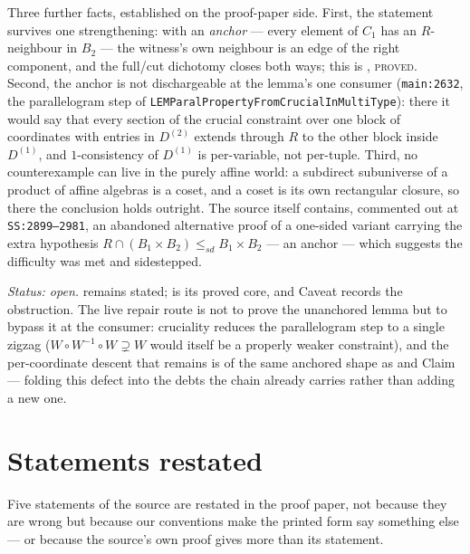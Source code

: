 Three further facts, established on the proof-paper side. First, the
statement survives one strengthening: with an \emph{anchor} --- every
element of $C_{1}$ has an $R$-neighbour in $B_{2}$ --- the witness's own
neighbour is an edge of the right component, and the full/cut dichotomy
closes both ways; this is ,
\textsc{proved}. Second, the anchor is not dischargeable at the lemma's one
consumer (\texttt{main:2632}, the parallelogram step of
\texttt{LEMParalPropertyFromCrucialInMultiType}): there it would say that
every section of the crucial constraint over one block of coordinates with
entries in $D^{(2)}$ extends through $R$ to the other block inside
$D^{(1)}$, and $1$-consistency of $D^{(1)}$ is per-variable, not
per-tuple. Third, no counterexample can live in the purely affine world:
a subdirect subuniverse of a product of affine algebras is a coset, and a
coset is its own rectangular closure, so there the conclusion holds
outright. The source itself contains, commented out at
\texttt{SS:2899--2981}, an abandoned alternative proof of a one-sided
variant carrying the extra hypothesis
$R\cap(B_{1}\times B_{2})\le_{sd}B_{1}\times B_{2}$ --- an anchor ---
which suggests the difficulty was met and sidestepped.

\emph{Status: open.}  remains stated;
 is its proved core, and Caveat
 records the obstruction. The live repair route
is not to prove the unanchored lemma but to bypass it at the consumer:
cruciality reduces the parallelogram step to a single zigzag
($W\circ W^{-1}\circ W\supsetneq W$ would itself be a properly weaker
constraint), and the per-coordinate descent that remains is of the same
anchored shape as  and
Claim~ --- folding this defect into the debts the
chain already carries rather than adding a new one.

\section{Statements restated}\label{sec:restated}

Five statements of the source are restated in the proof paper, not because they
are wrong but because our conventions make the printed form say something else
--- or because the source's own proof gives more than its statement.

